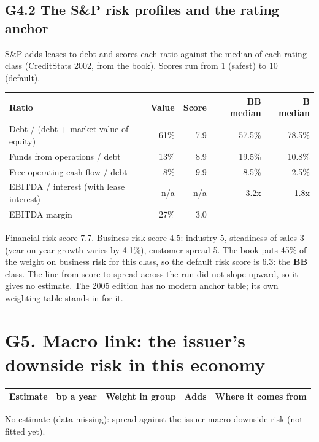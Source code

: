\documentclass[11pt,a4paper]{article}
\begin{document}
\subsection*{G4.2 The S\&P risk profiles and the rating anchor}
S\&P adds leases to debt and scores each ratio against the median of each rating class (CreditStats 2002, from the book). Scores run from 1 (safest) to 10 (default).
\begin{center}\footnotesize\setlength{\tabcolsep}{3.5pt}\begin{tabular}{@{}lrrrr@{}}\toprule
Ratio & Value & Score & BB median & B median \\\midrule
Debt / (debt + market value of equity) & 61\% & 7.9 & 57.5\% & 78.5\% \\
Funds from operations / debt & 13\% & 8.9 & 19.5\% & 10.8\% \\
Free operating cash flow / debt & -8\% & 9.9 & 8.5\% & 2.5\% \\
EBITDA / interest (with lease interest) & n/a & n/a & 3.2x & 1.8x \\
EBITDA margin & 27\% & 3.0 &  &  \\
\bottomrule\end{tabular}\end{center}
Financial risk score 7.7. Business risk score 4.5: industry 5, steadiness of sales 3 (year-on-year growth varies by 4.1\%), customer spread 5. The book puts 45\% of the weight on business risk for this class, so the default risk score is 6.3: the \textbf{BB} class. The line from score to spread across the run did not slope upward, so it gives no estimate. The 2005 edition has no modern anchor table; its own weighting table stands in for it.
\section*{G5. Macro link: the issuer's downside risk in this economy}
\par\noindent{}
\begin{center}\footnotesize\setlength{\tabcolsep}{3.5pt}\begin{tabular}{@{}p{6.2cm}rrrp{4.2cm}@{}}\toprule
Estimate & bp a year & Weight in group & Adds & Where it comes from \\\midrule
\bottomrule\end{tabular}\end{center}
No estimate (data missing): spread against the issuer-macro downside risk (not fitted yet).
\end{document}
